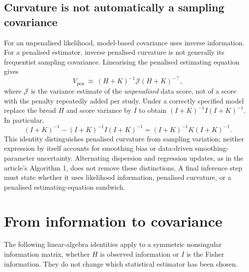 \documentclass[11pt,a4paper]{article}
\numberwithin{equation}{section}
\begin{document}
\subsection{Curvature is not automatically a sampling covariance}
For an unpenalised likelihood, model-based covariance uses inverse
information. For a penalised estimator, inverse penalised curvature is
not generally its frequentist sampling covariance. Linearising the
penalised estimating equation gives
\begin{equation}\label{eq:penalty-covariance}
 V_{\mathrm{pen}}\ \approx\
 (H+K)^{-1}\mathcal J(H+K)^{-\top},
\end{equation}
where $\mathcal J$ is the variance estimate of the \emph{unpenalised}
data score, not of a score with the penalty repeatedly added per study.
Under a correctly specified model replace the bread $H$ and score variance
by $I$ to obtain $(I+K)^{-1}I(I+K)^{-1}$. In particular,
\begin{equation}
 (I+K)^{-1}-(I+K)^{-1}I(I+K)^{-1}
 =(I+K)^{-1}K(I+K)^{-1}.
\end{equation}
This identity distinguishes penalised curvature from sampling variation;
neither expression by itself accounts for smoothing bias or data-driven
smoothing-parameter uncertainty.
Alternating dispersion and regression updates, as in the article's
Algorithm 1, does not remove these distinctions. A final inference step
must state whether it uses likelihood information, penalised curvature,
or a penalised estimating-equation sandwich.

\section{From information to covariance}\label{sec:covariance}

The following linear-algebra identities apply to a symmetric nonsingular
information matrix, whether $H$ is observed information or $I$ is the Fisher
information. They do not change which statistical estimator has been chosen.
\end{document}
